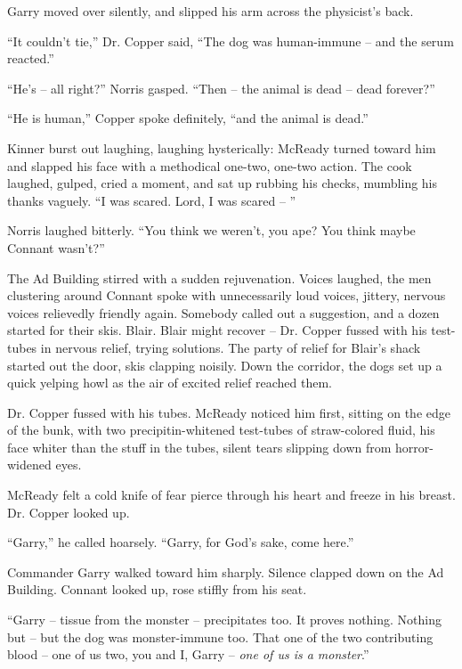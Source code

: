 \documentclass[letterpaper,openany,12pt]{memoir}		%
\begin{document}
Garry moved over silently, and slipped his arm across the physicist's back.

``It couldn't tie,'' Dr. Copper said, ``The dog was human-immune -- and the
serum reacted.''

``He's -- all right?'' Norris gasped. ``Then -- the animal is dead -- dead
forever?''

``He is human,'' Copper spoke definitely, ``and the animal is dead.''

Kinner burst out laughing, laughing hysterically: McReady turned toward him and
slapped his face with a methodical one-two, one-two action. The cook laughed,
gulped, cried a moment, and sat up rubbing his checks, mumbling his thanks
vaguely. ``I was scared. Lord, I was scared -- ''

Norris laughed bitterly. ``You think we weren't, you ape? You think maybe
Connant wasn't?''

The Ad Building stirred with a sudden rejuvenation. Voices laughed, the men
clustering around Connant spoke with unnecessarily loud voices, jittery, nervous
voices relievedly friendly again. Somebody called out a suggestion, and a dozen
started for their skis. Blair. Blair might recover -- Dr. Copper fussed with his
test-tubes in nervous relief, trying solutions. The party of relief for Blair's
shack started out the door, skis clapping noisily. Down the corridor, the dogs
set up a quick yelping howl as the air of excited relief reached them.

Dr. Copper fussed with his tubes. McReady noticed him first, sitting on the edge
of the bunk, with two precipitin-whitened test-tubes of straw-colored fluid, his
face whiter than the stuff in the tubes, silent tears slipping down from
horror-widened eyes.

McReady felt a cold knife of fear pierce through his heart and freeze in his
breast. Dr. Copper looked up.

``Garry,'' he called hoarsely. ``Garry, for God's sake, come here.''

Commander Garry walked toward him sharply. Silence clapped down on the Ad
Building. Connant looked up, rose stiffly from his seat.

``Garry -- tissue from the monster -- precipitates too. It proves nothing.
Nothing but -- but the dog was monster-immune too. That one of the two
contributing blood -- one of us two, you and I, Garry -- \emph{one of us is a
monster}.''


\end{document}
